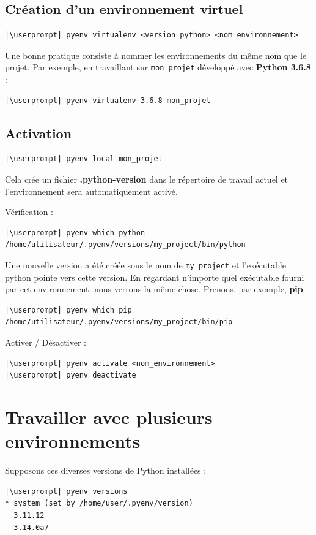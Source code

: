 \subsection*{Création d'un environnement virtuel}
\begin{lstlisting}[style=bash]
|\userprompt| pyenv virtualenv <version_python> <nom_environnement>
\end{lstlisting}

Une bonne pratique consiste à nommer les environnements du même nom que le projet. Par exemple, en travaillant sur \texttt{mon\_projet} développé avec \textbf{Python 3.6.8} :
\begin{lstlisting}[style=bash]
|\userprompt| pyenv virtualenv 3.6.8 mon_projet
\end{lstlisting}

\subsection*{Activation}
\begin{lstlisting}[style=bash]
|\userprompt| pyenv local mon_projet
\end{lstlisting}

Cela crée un fichier \textbf{.python-version} dans le répertoire de travail actuel et l'environnement sera automatiquement activé.

Vérification :
\begin{lstlisting}[style=bash]
|\userprompt| pyenv which python
/home/utilisateur/.pyenv/versions/my_project/bin/python
\end{lstlisting}

Une nouvelle version a été créée sous le nom de \texttt{my\_project} et l'exécutable python pointe vers cette version. En regardant n'importe quel exécutable fourni par cet environnement, nous verrons la même chose. Prenons, par exemple, \textbf{pip} :
\begin{lstlisting}[style=bash]
|\userprompt| pyenv which pip
/home/utilisateur/.pyenv/versions/my_project/bin/pip
\end{lstlisting}

Activer / Désactiver :
\begin{lstlisting}[style=bash]
|\userprompt| pyenv activate <nom_environnement>
|\userprompt| pyenv deactivate
\end{lstlisting}

\section{Travailler avec plusieurs environnements}
Supposons ces diverses versions de Python installées :
\begin{lstlisting}[style=bash]
|\userprompt| pyenv versions
* system (set by /home/user/.pyenv/version)
  3.11.12
  3.14.0a7
\end{lstlisting}

